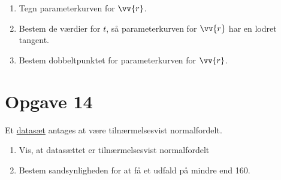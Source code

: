 \begin{enumerate}[label=\roman*)]
	\item Tegn parameterkurven for $\vv{r}$.
	\item Bestem de værdier for $t$, så parameterkurven for $\vv{r}$ har en lodret tangent.
	\item Bestem dobbeltpunktet for parameterkurven for $\vv{r}$. 
\end{enumerate}

\section*{Opgave 14}
Et \href{https://github.com/ChristianJLex/TeachingNotes/raw/master/2022-2023/Data%20og%20lign/tr%C3%A6ningTilTermin.xlsx}{\color{blue!60} datasæt} antages at være tilnærmelsesvist normalfordelt. 
\begin{enumerate}[label=\roman*)]
	\item Vis, at datasættet er tilnærmelsesvist normalfordelt
	\item Bestem sandsynligheden for at få et udfald på mindre end 160. 
\end{enumerate}
